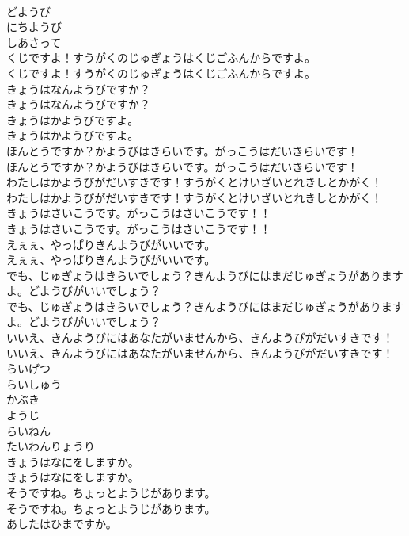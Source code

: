 \documentclass[8pt]{extreport}
\begin{document}
\begin{CJK}{UTF8}{min}
\\	どようび
\\	にちようび
\\	しあさって
\\	くじですよ！すうがくのじゅぎょうはくじごふんからですよ。	
\\	くじですよ！すうがくのじゅぎょうはくじごふんからですよ。 
\\	きょうはなんようびですか？	
\\	きょうはなんようびですか？ 
\\	きょうはかようびですよ。	
\\	きょうはかようびですよ。 
\\	ほんとうですか？かようびはきらいです。がっこうはだいきらいです！	
\\	ほんとうですか？かようびはきらいです。がっこうはだいきらいです！ 
\\	わたしはかようびがだいすきです！すうがくとけいざいとれきしとかがく！	
\\	わたしはかようびがだいすきです！すうがくとけいざいとれきしとかがく！ 
\\	きょうはさいこうです。がっこうはさいこうです！！	
\\	きょうはさいこうです。がっこうはさいこうです！！ 
\\	えぇぇ、やっぱりきんようびがいいです。	
\\	えぇぇ、やっぱりきんようびがいいです。 
\\	でも、じゅぎょうはきらいでしょう？きんようびにはまだじゅぎょうがありますよ。どようびがいいでしょう？	
\\	でも、じゅぎょうはきらいでしょう？きんようびにはまだじゅぎょうがありますよ。どようびがいいでしょう？ 
\\	いいえ、きんようびにはあなたがいませんから、きんようびがだいすきです！	
\\	いいえ、きんようびにはあなたがいませんから、きんようびがだいすきです！ 
\\	らいげつ
\\	らいしゅう
\\	かぶき
\\	ようじ
\\	らいねん
\\	たいわんりょうり
\\	きょうはなにをしますか。	
\\	きょうはなにをしますか。 
\\	そうですね。ちょっとようじがあります。	
\\	そうですね。ちょっとようじがあります。 
\\	あしたはひまですか。	

\end{CJK}
\end{document}
